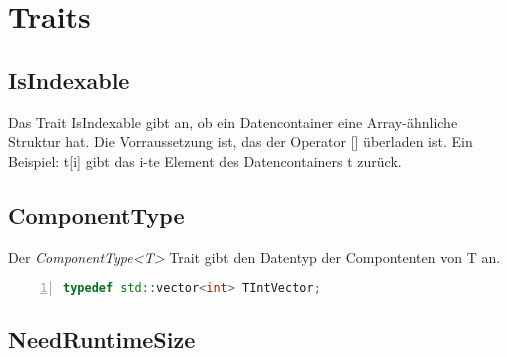 \section{Traits}

\subsection{IsIndexable}
\label{sec-IsIndexable}
Das Trait IsIndexable gibt an, ob ein Datencontainer eine Array-ähnliche Struktur hat. Die Vorraussetzung ist, das der Operator [] überladen ist. Ein Beispiel: t[i] gibt das i-te Element des Datencontainers t zurück. 


\subsection{ComponentType}
\label{sec-ComponentType}
Der \textit{ComponentType<T>} Trait gibt den Datentyp der Compontenten von T an. 
\begin{lstlisting}[language=c++, numbers=left]
 typedef std::vector<int> TIntVector;
\end{lstlisting}


\subsection{NeedRuntimeSize}
\label{sec-NeedRuntimeSize}
